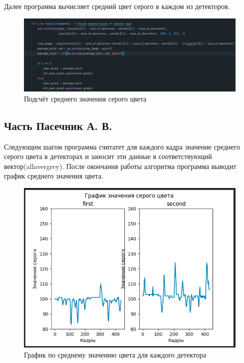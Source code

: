\documentclass[a4paper,12pt]{article}
\begin{document}
Далее программа вычисляет средний цвет серого в каждом из детекторов.

\begin{figure}[h!]
  \begin{center}
      \includegraphics[width=0.8\linewidth]{grayscale}
      \caption{Подсчёт среднего значения серого цвета} 
      \label{} 
  \end{center} 
\end{figure}

\newpage

\subsection{Часть Пасечник А. В.}
Следующим шагом программа считатет для каждого кадра значение среднего серого цвета в детекторах и заносит эти данные в соответствующий вектор(allavergrey).
После окончания работы алгоритма программа выводит график среднего значения цвета. 

\begin{figure}[h!]
  \begin{center}
      \includegraphics[width=0.8\linewidth]{gray_scale_graphic}
      \caption{График по среднему значению цвета для каждого детектора} 
      \label{} 
  \end{center} 
\end{figure}
\end{document}
